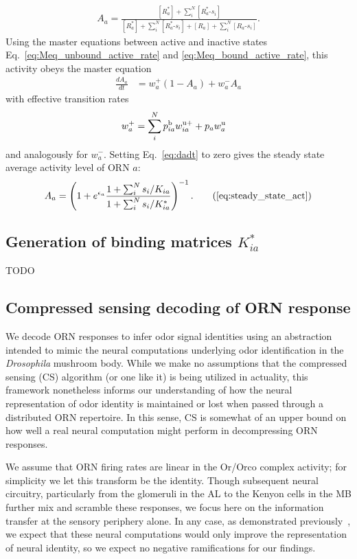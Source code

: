 \begin{align}
A_a = \frac{[R^*_a] + \sum_i^N[R^*_a\text{-}s_i]}{[R^*_a] + \sum_i^N[R^*_a\text{-}s_i] + {[R_a] + \sum_i^N[R_a\text{-}s_i]}}.
\end{align} 
Using the master equations between active and inactive states Eq.~\ref{eq:Meq_unbound_active_rate} and \ref{eq:Meq_bound_active_rate}, this activity obeys the master equation
\begin{align}
\frac{dA_a}{dt} &= w^+_a(1 - A_a) + w^-_aA_a
\label{eq:dadt}
\end{align}
with effective transition rates
\begin{align}
w^+_a &= \sum_i^Np^{\text b}_{ia} w^{\text u +}_{ia} + p_{a}w^{\text u}_a 
\end{align}
and analogously for $w_a^-$. Setting Eq.~\ref{eq:dadt} to zero gives the steady state average activity level of ORN $a$:
\begin{align}
A_a = \left(1 + e^{\epsilon_a}\frac{1 + \sum_i^N s_i/K_{ia}}{1 + \sum_i^N s_i/K^*_{ia}}\right)^{-1}. \tag{\ref{eq:steady_state_act}}
\end{align}
	
\subsection{Generation of binding matrices $K^*_{ia}$}
 TODO

\subsection{Compressed sensing decoding of ORN response}
We decode ORN responses to infer odor signal identities using an abstraction intended to mimic the neural computations underlying odor identification in the \textit{Drosophila} mushroom body. While we make no assumptions that the compressed sensing (CS) algorithm (or one like it) is being utilized in actuality, this framework nonetheless informs our understanding of how the neural representation of odor identity is maintained or lost when passed through a distributed ORN repertoire. In this sense, CS is somewhat of an upper bound on how well a real neural computation might perform in decompressing ORN responses.

We assume that ORN firing rates are linear in the Or/Orco complex activity; for simplicity we let this transform be the identity. Though subsequent neural circuitry, particularly from the glomeruli in the AL to the Kenyon cells in the MB further mix and scramble these responses, we focus here on the information transfer at the sensory periphery alone. In any case, as demonstrated previously~\cite{vijay_1}, we expect that these neural computations would only improve the representation of neural identity, so we expect no negative ramifications for our findings.

